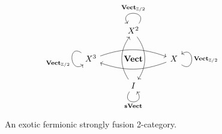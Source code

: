 \documentclass[10pt,a4paper]{amsart}
\numberwithin{equation}{section}
\begin{document}
\begin{figure}[!hbt]\vspace{-5mm}
$$\begin{tikzcd}
& X^2 \arrow[dd, bend left=35] \arrow["\mathbf{Vect}_{\mathbb{Z}/2}"', loop, distance=2em, in=125, out=55] &\\
X^3 \arrow[rr, bend left = 20] \arrow["\mathbf{Vect}_{\mathbb{Z}/2}"', loop, distance=2em, in=215, out=145] & \mathbf{Vect}& X \arrow[ll, bend left = 20] \arrow["\mathbf{Vect}_{\mathbb{Z}/2}"', loop, distance=2em, in=35, out=325] \\
& I \arrow[uu, bend left=35] \arrow["\mathbf{sVect}"', loop, distance=2em, in=305, out=235] &
\end{tikzcd}$$
\caption{An exotic fermionic strongly fusion 2-category.}
\label{fig:exoticFSF2C}
\end{figure}
\end{document}
